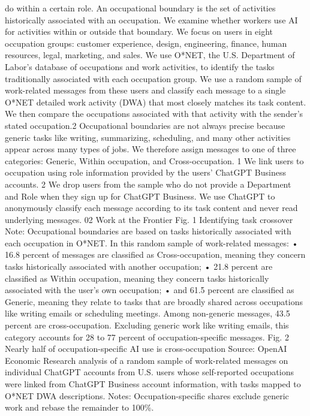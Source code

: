 do within a certain role.
An occupational boundary is the set of activities historically associated with
an occupation. We examine whether workers use AI for activities within or
outside that boundary.
We focus on users in eight occupation groups: customer experience, design, engineering, finance, human
resources, legal, marketing, and sales. We use O*NET, the U.S. Department of Labor’s database of
occupations and work activities, to identify the tasks traditionally associated with each occupation group.
We use a random sample of work-related messages from these users and classify each message to a
single O*NET detailed work activity (DWA) that most closely matches its task content. We then compare
the occupations associated with that activity with the sender’s stated occupation.2 Occupational
boundaries are not always precise because generic tasks like writing, summarizing, scheduling, and
many other activities appear across many types of jobs. We therefore assign messages to one of three
categories: Generic, Within occupation, and Cross-occupation.
1 We link users to occupation using role information provided by the users’ ChatGPT Business accounts.
2 We drop users from the sample who do not provide a Department and Role when they sign up for ChatGPT Business. We use
ChatGPT to anonymously classify each message according to its task content and never read underlying messages.
02
Work at the Frontier
Fig. 1
Identifying task crossover
Note: Occupational boundaries are based on tasks historically associated with each occupation in O*NET.
In this random sample of work-related messages:
• 16.8 percent of messages are classified as Cross-occupation, meaning they concern tasks historically
associated with another occupation;
• 21.8 percent are classified as Within occupation, meaning they concern tasks historically associated
with the user’s own occupation;
• and 61.5 percent are classified as Generic, meaning they relate to tasks that are broadly shared across
occupations like writing emails or scheduling meetings.
Among non-generic messages, 43.5 percent are cross-occupation. Excluding generic work like writing
emails, this category accounts for 28 to 77 percent of occupation-specific messages.
Fig. 2
Nearly half of occupation-specific AI use is cross-occupation
Source: OpenAI Economic Research analysis of a random sample of work-related messages on individual ChatGPT accounts
from U.S. users whose self-reported occupations were linked from ChatGPT Business account information, with tasks mapped
to O*NET DWA descriptions. Notes: Occupation-specific shares exclude generic work and rebase the remainder to 100\%.
